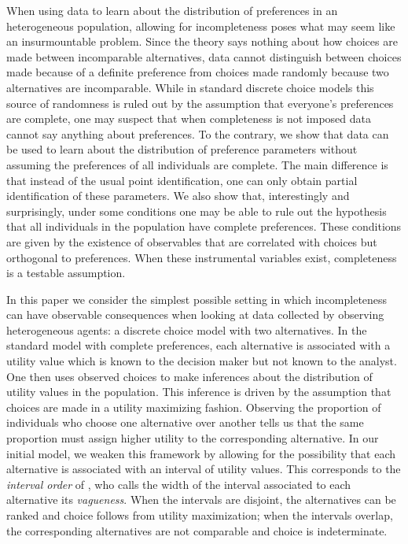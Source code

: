 \documentclass[reqno]{article}
\renewcommand{\cite}{\citet}
\begin{document}
When using data to learn about the distribution of preferences in an
heterogeneous population, allowing for incompleteness poses what may seem
like an insurmountable problem. Since the theory says nothing about how
choices are made between incomparable alternatives, data cannot distinguish
between choices made because of a definite preference from choices made
randomly because two alternatives are incomparable. While in standard
discrete choice models this source of randomness is ruled out by the
assumption that everyone's preferences are complete, one may suspect that
when completeness is not imposed data cannot say anything about preferences.
To the contrary, we show that data can be used to learn about the
distribution of preference parameters without assuming the preferences of
all individuals are complete. The main difference is that instead of the
usual point identification, one can only obtain partial identification of
these parameters. We also show that, interestingly and surprisingly, under
some conditions one may be able to rule out the hypothesis that all
individuals in the population have complete preferences. These conditions
are given by the existence of observables that are correlated with choices
but orthogonal to preferences. When these instrumental variables exist,
completeness is a testable assumption.

In this paper we consider the simplest possible setting in which
incompleteness can have observable consequences when looking at data
collected by observing heterogeneous agents: a discrete choice model with
two alternatives. In the standard model with complete preferences, each
alternative is associated with a utility value which is known to the
decision maker but not known to the analyst. One then uses observed choices
to make inferences about the distribution of utility values in the
population. This inference is driven by the assumption that choices are made
in a utility maximizing fashion. Observing the proportion of individuals who
choose one alternative over another tells us that the same proportion must
assign higher utility to the corresponding alternative. In our initial
model, we weaken this framework by allowing for the possibility that each
alternative is associated with an interval of utility values. This
corresponds to the \emph{interval order} of \cite{Fishburn1970book}, who
calls the width of the interval associated to each alternative its \emph{%
vagueness}. When the intervals are disjoint, the alternatives can be ranked
and choice follows from utility maximization; when the intervals overlap,
the corresponding alternatives are not comparable and choice is
indeterminate.
\end{document}
